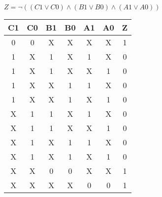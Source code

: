 
\begin{center}
    {\(Z = \lnot ((C1 \lor C0) \land (B1 \lor B0) \land (A1 \lor A0)) \)}
    \begin{table}[h] %
        \begin{center}
            \begin{tabular}{|c|c|c|c|c|c||c|} \hline
            C1 & C0 & B1 & B0 & A1 & A0 & Z \\ \hline\hline
            0  & 0  & X  & X  & X  & X  & 1 \\ \hline
            1  & X  & 1  & X  & 1  & X  & 0 \\ \hline
            1  & X  & 1  & X  & X  & 1  & 0 \\ \hline
            1  & X  & X  & 1  & 1  & X  & 0 \\ \hline
            1  & X  & X  & 1  & X  & 1  & 0 \\ \hline
            X  & 1  & 1  & X  & 1  & X  & 0 \\ \hline
            X  & 1  & 1  & X  & X  & 1  & 0 \\ \hline
            X  & 1  & X  & 1  & 1  & X  & 0 \\ \hline
            X  & 1  & X  & 1  & X  & 1  & 0 \\ \hline
            X  & X  & 0  & 0  & X  & X  & 1 \\ \hline
            X  & X  & X  & X  & 0  & 0  & 1 \\ \hline
            \end{tabular}
        \end{center}
    \end{table}
\end{center}
